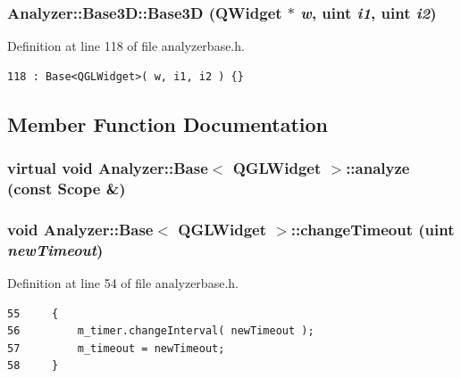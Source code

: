 \subsubsection{\setlength{\rightskip}{0pt plus 5cm}Analyzer::Base3D::Base3D ({\bf QWidget} $\ast$ {\em w}, uint {\em i1}, uint {\em i2})\hspace{0.3cm}{\tt  [inline, protected]}}\label{classAnalyzer_1_1Base3D_Analyzer_1_1Base3Db0}




Definition at line 118 of file analyzerbase.h.



\footnotesize\begin{verbatim}118 : Base<QGLWidget>( w, i1, i2 ) {}
\end{verbatim}\normalsize 


\subsection{Member Function Documentation}
\subsubsection{\setlength{\rightskip}{0pt plus 5cm}virtual void {\bf Analyzer::Base}$<$ {\bf QGLWidget}  $>$::analyze (const {\bf Scope} \&)\hspace{0.3cm}{\tt  [protected, pure virtual, inherited]}}\label{classAnalyzer_1_1Base_Analyzer_1_1Baseb3}


\subsubsection{\setlength{\rightskip}{0pt plus 5cm}void {\bf Analyzer::Base}$<$ {\bf QGLWidget}  $>$::change\-Timeout (uint {\em new\-Timeout})\hspace{0.3cm}{\tt  [inline, protected, inherited]}}\label{classAnalyzer_1_1Base_Analyzer_1_1Baseb6}




Definition at line 54 of file analyzerbase.h.



\footnotesize\begin{verbatim}55     {
56         m_timer.changeInterval( newTimeout );
57         m_timeout = newTimeout;
58     }
\end{verbatim}\normalsize 
{}
